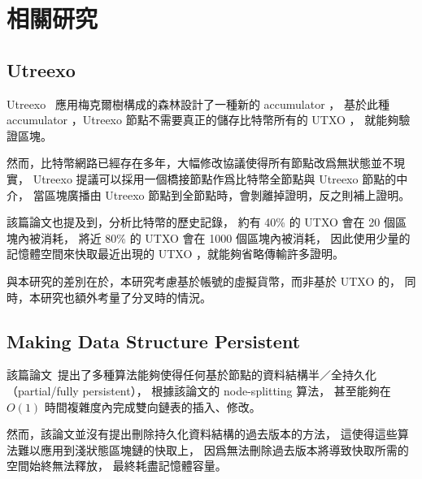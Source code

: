 \chapter{相關研究}
\label{c:related}

\section{Utreexo}
Utreexo~\cite{dryja2019utreexo} 應用梅克爾樹構成的森林設計了一種新的 accumulator ，
基於此種 accumulator ，Utreexo 節點不需要真正的儲存比特幣所有的 UTXO ，
就能夠驗證區塊。

然而，比特幣網路已經存在多年，大幅修改協議使得所有節點改爲無狀態並不現實，
Utreexo 提議可以採用一個橋接節點作爲比特幣全節點與 Utreexo 節點的中介，
當區塊廣播由 Utreexo 節點到全節點時，會剝離掉證明，反之則補上證明。

該篇論文也提及到，分析比特幣的歷史記錄，
約有 40\% 的 UTXO 會在 20 個區塊內被消耗，
將近 80\% 的 UTXO 會在 1000 個區塊內被消耗，
因此使用少量的記憶體空間來快取最近出現的 UTXO ，就能夠省略傳輸許多證明。

與本研究的差別在於，本研究考慮基於帳號的虛擬貨幣，而非基於 UTXO 的，
同時，本研究也額外考量了分叉時的情況。

\section{Making Data Structure Persistent}
該篇論文~\cite{driscoll1986making}提出了多種算法能夠使得任何基於節點的資料結構半／全持久化（partial/fully persistent），
根據該論文的 node-splitting 算法，
甚至能夠在 $O(1)$ 時間複雜度內完成雙向鏈表的插入、修改。

然而，該論文並沒有提出刪除持久化資料結構的過去版本的方法，
這使得這些算法難以應用到淺狀態區塊鏈的快取上，
因爲無法刪除過去版本將導致快取所需的空間始終無法釋放，
最終耗盡記憶體容量。